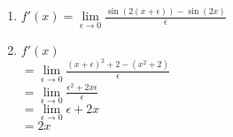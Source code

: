 \item

\begin{enumerate}
\item $f'(x) = \lim\limits_{\epsilon\to 0} \frac{\sin(2(x+\epsilon)) - \sin(2x)}{\epsilon}$
\item
$f'(x)$ \\
$= \lim\limits_{\epsilon \to 0} \frac{(x+\epsilon)^2+2-(x^2+2)}{\epsilon}$ \\
$= \lim\limits_{\epsilon \to 0} \frac{\epsilon^2+2x\epsilon}{\epsilon}$ \\
$=\lim\limits_{\epsilon \to 0} \epsilon+2x$ \\
$= 2x$

\end{enumerate}

